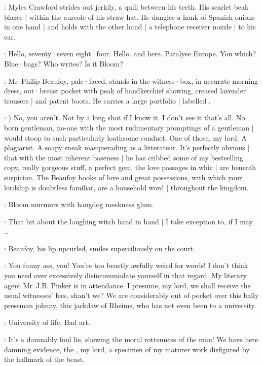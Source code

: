:
Myles Crawford strides out jerkily,
a quill between his teeth.
His scarlet beak blazes |
within the aureole of his straw hat.
He dangles a hank of Spanish onions in one hand |
and holds with the other hand |
a telephone receiver nozzle |
to his ear.

\Myles:
Hello,
seventy·seven eight·four.
Hello.
and 
here.
Paralyse Europe.
You which?
Blue·bags?
Who writes?
Is it Bloom?

:
Mr~Philip Beaufoy,
pale·faced,
stands in the witness·box,
in accurate morning dress,
out·breast pocket with peak of handkerchief showing,
creased lavender trousers |
and patent boots.
He carries a large portfolio |
labelled .

\Beaufoy:
)
No,
you aren't.
Not by a long shot if I know it.
I don't see it that's all.
No born gentleman,
no-one with the most rudimentary promptings of a gentleman |
would stoop to such particularly loathsome conduct.
One of those,
my lord.
A plagiarist.
A soapy sneak masquerading as a litterateur.
It's perfectly obvious |
that with the most inherent baseness |
he has cribbed some of my bestselling copy,
really gorgeous stuff,
a perfect gem,
the love passages in whic |
are beneath suspicion.
The Beaufoy books of love and great possessions,
with which your lordship is doubtless familiar,
are a household word |
throughout the kingdom.

:
Bloom murmurs with hangdog meekness glum.

\Bloom:
That bit about the laughing witch
hand in hand |
I take exception to,
if I may \ldots

:
Beaufoy,
his lip upcurled,
smiles superciliously on the court.

\Beaufoy:
You funny ass,
you!
You're too beastly awfully weird for words!
I don't think you need over excessively disincommodate yourself in that regard.
My literary agent Mr~J.B.
Pinker is in attendance.
I presume,
my lord,
we shall receive the usual witnesses' fees,
shan't we?
We are considerably out of pocket over this bally pressman johnny,
this jackdaw of Rheims,
who has not even been to a university.

\Bloom:
University of life.
Bad art.

\Beaufoy:
It's a damnably foul lie,
showing the moral rottenness of the man!
We have here damning evidence,
the ,
my lord,
a specimen of my maturer work disfigured by the hallmark of the beast.

